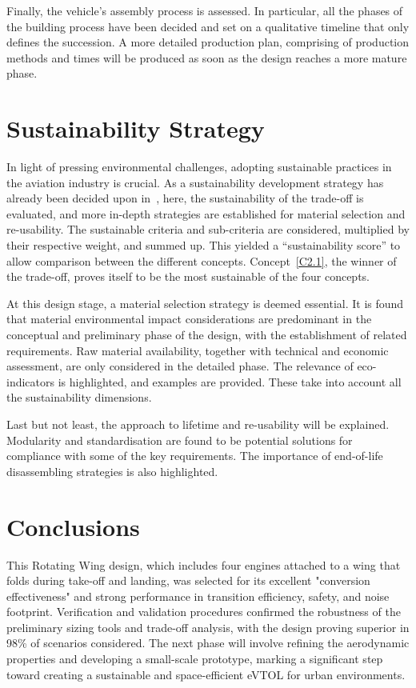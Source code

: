 Finally, the vehicle's assembly process is assessed.
In particular, all the phases of the building process have been decided and set on a qualitative timeline that only defines the succession. A more detailed production plan, comprising of production methods and times will be produced as soon as the design reaches a more mature phase.

\section*{Sustainability Strategy}
In light of pressing environmental challenges, adopting sustainable practices in the aviation industry is crucial.
As a sustainability development strategy has already been decided upon in~\cite{baselinerepo}, here, the sustainability of the trade-off is evaluated, and more in-depth strategies are established for material selection and re-usability.
The sustainable criteria and sub-criteria are considered, multiplied by their respective weight, and summed up.
This yielded a \enquote{sustainability score} to allow comparison between the different concepts.
Concept~\ref{C2.1}, the winner of the trade-off, proves itself to be the most sustainable of the four concepts.

At this design stage, a material selection strategy is deemed essential.
It is found that material environmental impact considerations are predominant in the conceptual and preliminary phase of the design, with the establishment of related requirements.
Raw material availability, together with technical and economic assessment, are only considered in the detailed phase.
The relevance of eco-indicators is highlighted, and examples are provided.
These take into account all the sustainability dimensions.

Last but not least, the approach to lifetime and re-usability will be explained.
Modularity and standardisation are found to be potential solutions for compliance with some of the key requirements.
The importance of end-of-life disassembling strategies is also highlighted.



\section*{Conclusions}
This Rotating Wing design, which includes four engines attached to a wing that folds during take-off and landing, was selected for its excellent "conversion effectiveness" and strong performance in transition efficiency, safety, and noise footprint. Verification and validation procedures confirmed the robustness of the preliminary sizing tools and trade-off analysis, with the design proving superior in 98\% of scenarios considered. The next phase will involve refining the aerodynamic properties and developing a small-scale prototype, marking a significant step toward creating a sustainable and space-efficient eVTOL for urban environments.

